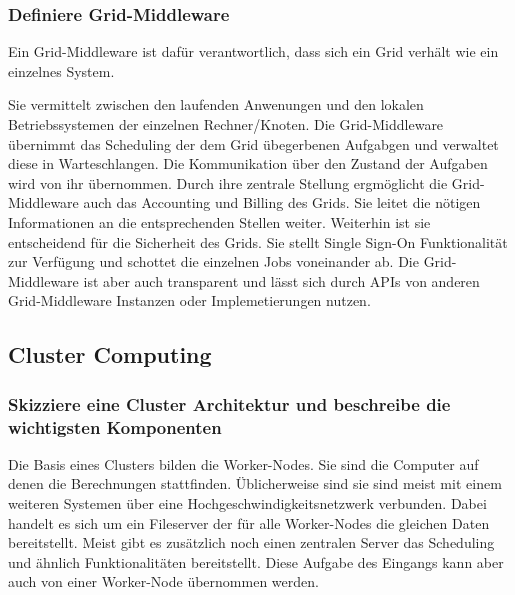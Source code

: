 \subsubsection{Definiere Grid-Middleware}
	Ein Grid-Middleware ist daf\"ur verantwortlich,
	dass sich ein Grid verh\"alt wie ein einzelnes System.
	
	Sie vermittelt zwischen den laufenden Anwenungen und den lokalen
	Betriebssystemen der einzelnen Rechner/Knoten.
	Die Grid-Middleware \"ubernimmt das Scheduling der dem Grid \"ubegerbenen
	Aufgabgen und verwaltet diese in Warteschlangen.
	Die Kommunikation \"uber den Zustand der Aufgaben wird von ihr \"ubernommen.
	Durch ihre zentrale Stellung ergm\"oglicht die Grid-Middleware auch
	das Accounting und Billing des Grids.
	Sie leitet die n\"otigen Informationen an die entsprechenden Stellen weiter.
	Weiterhin ist sie entscheidend f\"ur die Sicherheit des Grids.
	Sie stellt Single Sign-On Funktionalit\"at zur Verf\"ugung und
	schottet die einzelnen Jobs voneinander ab.
	Die Grid-Middleware ist aber auch transparent und l\"asst sich durch APIs
	von anderen Grid-Middleware Instanzen oder Implemetierungen nutzen.

\subsection{Cluster Computing}
	\subsubsection{Skizziere eine Cluster Architektur und beschreibe die wichtigsten Komponenten}

	Die Basis eines Clusters bilden die Worker-Nodes.
	Sie sind die Computer auf denen die Berechnungen stattfinden.
	\"Ublicherweise sind sie sind meist mit einem weiteren Systemen \"uber
	eine Hochgeschwindigkeitsnetzwerk verbunden.
	Dabei handelt es sich um ein Fileserver der f\"ur alle Worker-Nodes
	die gleichen Daten bereitstellt.
	Meist gibt es zus\"atzlich noch einen zentralen Server das Scheduling und ähnlich Funktionalit\"aten
	bereitstellt.
	Diese Aufgabe des Eingangs kann aber auch von einer Worker-Node \"ubernommen werden.

